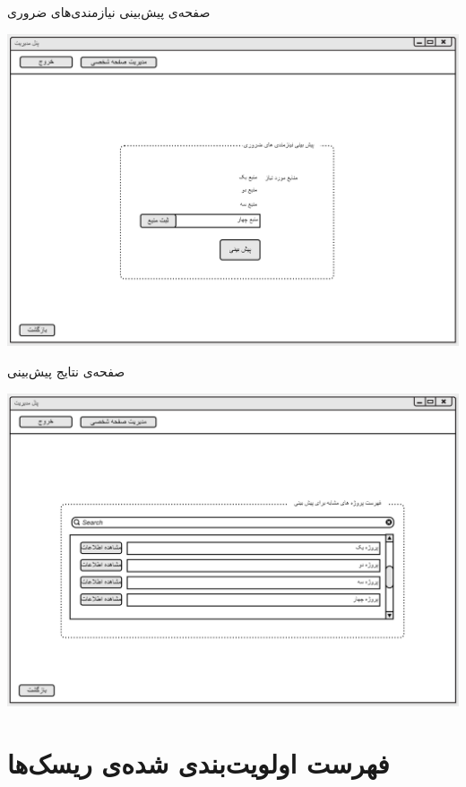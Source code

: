 \documentclass{article}
\begin{document}
\vspace{1cm}
صفحه‌ی پیش‌بینی نیازمندی‌های ضروری
\begin{center}
\includegraphics[width=\textwidth]{Prototype/Predict/RequirementsPrediction.png}
\end{center}

\newpage
\vspace{1cm}
صفحه‌ی نتایج پیش‌بینی
\begin{center}
\includegraphics[width=\textwidth]{Prototype/Predict/Result.png}
\end{center}


\newpage
\section{فهرست اولویت‌بندی شده‌ی ریسک‌ها}
\end{document}
